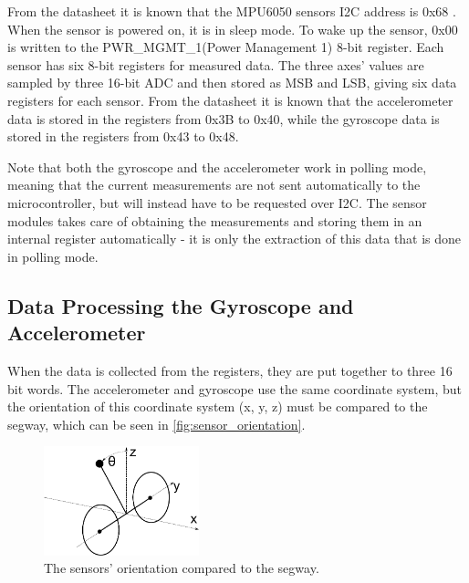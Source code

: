 From the datasheet it is known that the MPU6050 sensors \gls{I2C} address is 0x68 \citep[p. 46]{gyro}. When the sensor is powered on, it is in sleep mode. To wake up the sensor, 0x00 is written to the PWR\_MGMT\_1(Power Management 1) 8-bit register. Each sensor has six 8-bit registers for measured data. The three axes' values are sampled by three 16-bit ADC and then stored as MSB and LSB, giving six data registers for each sensor. From the datasheet it is known that the accelerometer data is stored in the registers from 0x3B to 0x40, while the gyroscope data is stored in the registers from 0x43 to 0x48. 

Note that both the gyroscope and the accelerometer work in polling mode, meaning that the current measurements are not sent automatically to the microcontroller, but will instead have to be requested over \gls{I2C}. The sensor modules takes care of obtaining the measurements and storing them in an internal register automatically - it is only the extraction of this data that is done in polling mode.

\subsection{Data Processing the Gyroscope and Accelerometer}
When the data is collected from the registers, they are put together to three 16 bit words. The accelerometer and gyroscope use the same coordinate system, but the orientation of this coordinate system (x, y, z) must be compared to the segway, which can be seen in \autoref{fig:sensor_orientation}. 

\begin{figure}[H]
\centering
\includegraphics[width=0.4\textwidth]{figures/3D_seg_balance.pdf}
\caption{The sensors' orientation compared to the segway.}
\label{fig:sensor_orientation}
\end{figure}


